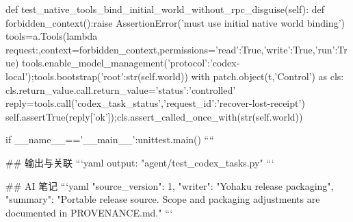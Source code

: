  def test_native_tools_bind_initial_world_without_rpc_disguise(self):
  def forbidden_context():raise AssertionError('must use initial native world binding')
  tools=a.Tools(lambda request:{},context=forbidden_context,permissions={'read':True,'write':True,'run':True})
  tools.enable_model_management({'protocol':'codex-local'});tools.bootstrap({'root':str(self.world)})
  with patch.object(t,'Control') as cls:
   cls.return_value.call.return_value={'status':'controlled'}
   reply=tools.call('codex_task_status',{'request_id':'recover-lost-receipt'})
   self.assertTrue(reply['ok']);cls.assert_called_once_with(str(self.world))

if __name__=='__main__':unittest.main()
````

## 输出与关联
```yaml
output: "agent/test_codex_tasks.py"
```

## AI 笔记
```yaml
{"source_version": 1, "writer": "Yohaku release packaging", "summary": "Portable release source. Scope and packaging adjustments are documented in PROVENANCE.md."}
```
